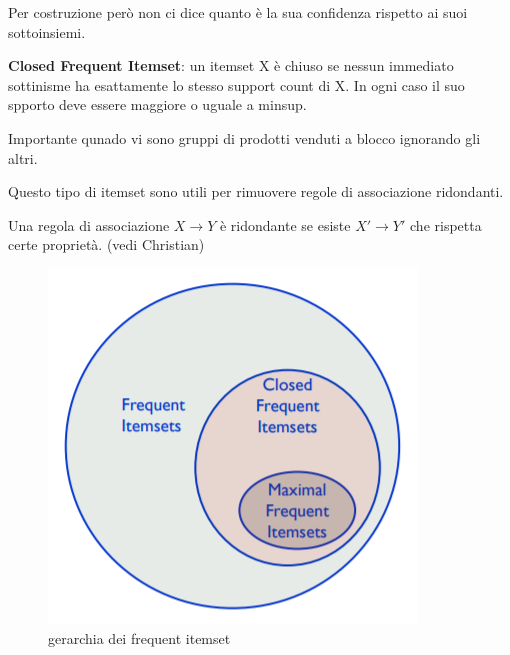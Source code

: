 Per costruzione per\`o non ci dice quanto \`e la sua confidenza rispetto ai suoi sottoinsiemi. 

\textbf{Closed Frequent Itemset}: un itemset X \`e chiuso se nessun immediato sottinisme ha esattamente lo stesso support count di X. In ogni caso il suo spporto deve essere maggiore o uguale a minsup.

Importante qunado vi sono gruppi di prodotti venduti a blocco ignorando gli altri.

Questo tipo di itemset sono utili per rimuovere regole di associazione ridondanti. 

Una regola di associazione $X \rightarrow Y$ \`e ridondante se esiste $X' \rightarrow Y'$ che rispetta certe propriet\`a. (vedi Christian)

\begin{figure}[H]
	\centering
	\includegraphics[height=0.45 \linewidth]{association/pict/itemset_freq.png}
	\caption{gerarchia dei frequent itemset}
\end{figure}

